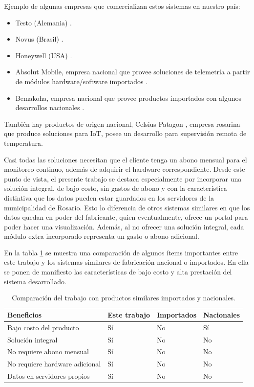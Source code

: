 Ejemplo de algunas empresas que comercializan estos sistemas en nuestro país: 
\begin{itemize}
\item Testo (Alemania) \citep{testo}. 
\item Novus (Brasil) \citep{novus}. 
\item Honeywell (USA) \citep{honeywell}.  
\item Absolut Mobile, empresa nacional que provee soluciones de telemetría a partir de módulos hardware/software importados \citep{absolutmobile}.
\item Bemakoha, empresa nacional que provee productos importados con algunos desarrollos nacionales \citep{bemakoha}.
\end{itemize}

También hay productos de origen nacional, Celsius Patagon \citep{celsius}, empresa rosarina que produce soluciones para IoT, posee un desarrollo para supervisión remota de temperatura. 
 

Casi todas las soluciones necesitan que el cliente tenga un abono mensual para el monitoreo continuo, además de adquirir el hardware correspondiente. Desde este punto de vista, el presente trabajo se destaca especialmente por incorporar una solución integral, de bajo costo, sin gastos de abono y con la característica distintiva que los datos pueden estar guardados en los servidores de la municipalidad de Rosario. Esto lo diferencia de otros sistemas similares en que los datos quedan en poder del fabricante, quien eventualmente, ofrece un portal para poder hacer una visualización. Además, al no ofrecer una solución integral, cada módulo extra incorporado representa un gasto o abono adicional.

En la tabla \ref{tab:comparacionsistemas} se muestra una comparación de algunos ítems importantes entre este trabajo y los sistemas similares de fabricación nacional o importados. En ella se ponen de manifiesto las características de bajo costo y alta prestación del sistema desarrollado.


\begin{table}[h]
	\centering
	\caption[Comparación del trabajo con productos similares importados y nacionales.]{Comparación del trabajo con productos similares importados y nacionales.}
	\begin{tabular}{l l l l}    
	\toprule
	\textbf{Beneficios}    & \textbf{Este trabajo} & \textbf{Importados}& \textbf{Nacionales}\\
	\midrule
Bajo costo del producto & Sí&No &Sí\\
Solución integral& Sí&No &No\\	
No requiere abono mensual & Sí&No &No\\	
No requiere hardware adicional& Sí&No &No\\	
Datos en servidores propios& Sí&No &No\\	
		\bottomrule
		\hline
	\end{tabular}
	\label{tab:comparacionsistemas}
\end{table}

